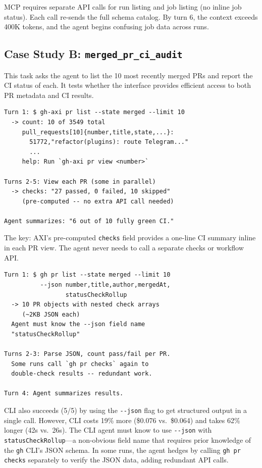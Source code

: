 \documentclass{article}
\begin{document}
MCP requires separate API calls for run listing and job listing (no
inline job status). Each call re-sends the full schema catalog.
By turn 6, the context exceeds 400K tokens, and the agent begins
confusing job data across runs.

\subsection{Case Study B: \texttt{merged\_pr\_ci\_audit}}

This task asks the agent to list the 10 most recently merged PRs and
report the CI status of each. It tests whether the interface provides
efficient access to both PR metadata and CI results.

\begin{lstlisting}[caption={AXI: 5 turns, \$0.064, 26s (SUCCESS 5/5).}]
Turn 1: $ gh-axi pr list --state merged --limit 10
  -> count: 10 of 3549 total
     pull_requests[10]{number,title,state,...}:
       51772,"refactor(plugins): route Telegram..."
       ...
     help: Run `gh-axi pr view <number>`

Turns 2-5: View each PR (some in parallel)
  -> checks: "27 passed, 0 failed, 10 skipped"
     (pre-computed -- no extra API call needed)

Agent summarizes: "6 out of 10 fully green CI."
\end{lstlisting}

The key: AXI's pre-computed \texttt{checks} field provides a one-line CI
summary inline in each PR view. The agent never needs to call a separate
checks or workflow API.

\begin{lstlisting}[caption={CLI: 4 turns, \$0.076, 42s (SUCCESS 5/5).}]
Turn 1: $ gh pr list --state merged --limit 10
          --json number,title,author,mergedAt,
                 statusCheckRollup
  -> 10 PR objects with nested check arrays
     (~2KB JSON each)
  Agent must know the --json field name
  "statusCheckRollup"

Turns 2-3: Parse JSON, count pass/fail per PR.
  Some runs call `gh pr checks` again to
  double-check results -- redundant work.

Turn 4: Agent summarizes results.
\end{lstlisting}

CLI also succeeds (5/5) by using the \texttt{-{}-json} flag to get
structured output in a single call. However, CLI costs 19\% more
(\$0.076 vs.\ \$0.064) and takes 62\% longer (42s vs.\ 26s).
The CLI agent must know to use \texttt{-{}-json} with
\texttt{statusCheckRollup}---a non-obvious field name that requires
prior knowledge of the \texttt{gh} CLI's JSON schema. In some runs,
the agent hedges by calling \texttt{gh pr checks} separately to
verify the JSON data, adding redundant API calls.
\end{document}
